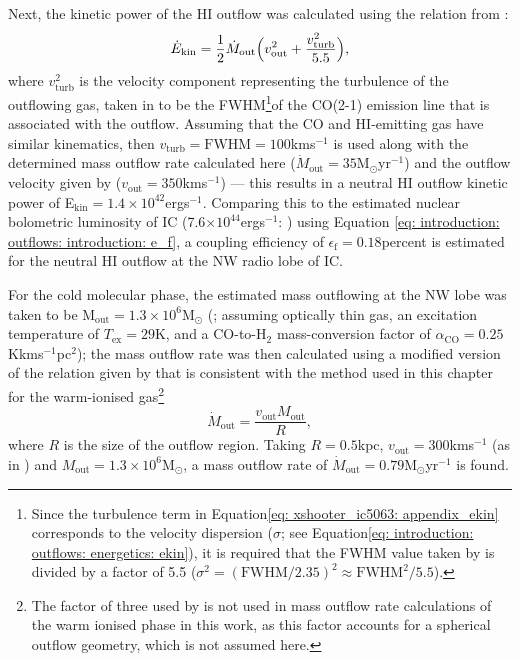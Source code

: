 Next, the kinetic power of the HI outflow was calculated using the relation from \citet{Morganti2015}:
\begin{equation}
    \dot{E}_\mathrm{kin} = \frac{1}{2}\dot{M}_\mathrm{out}\Bigl(v^2_\mathrm{out}+\frac{v^2_\mathrm{turb}}{5.5}\Bigr),
\label{eq: xshooter_ic5063: appendix_ekin}
\end{equation}
where $v^2_\mathrm{turb}$ is the velocity component representing the turbulence of the outflowing gas, taken in \citet{Morganti2015} to be the FWHM\footnote{Since the turbulence term in Equation\;\ref{eq: xshooter_ic5063: appendix_ekin} corresponds to the velocity dispersion ($\sigma$; see Equation\;\ref{eq: introduction: outflows: energetics: ekin}), it is required that the FWHM value taken by \citet{Morganti2015} is divided by a factor of 5.5 ($\sigma^2=(\mathrm{FWHM}/2.35)^2\approx\mathrm{FWHM}^2/5.5$).}of the CO(2-1) emission line that is associated with the outflow. Assuming that the CO and HI-emitting gas have similar kinematics, then $v_\mathrm{turb}=\mathrm{FWHM}=100$\;km\;s$^{-1}$ \citep{Morganti2015} is used along with the determined mass outflow rate calculated here ($\dot{M}_\mathrm{out}=35$\;M$_\odot$\;yr$^{-1}$) and the outflow velocity given by \citet{Morganti2005} ($v_\mathrm{out}=350$\;km\;s$^{-1}$) --- this results in a neutral HI outflow kinetic power of \mbox{E$_\mathrm{kin}=1.4\times10^{42}$\;erg\;s$^{-1}$}. Comparing this to the estimated nuclear bolometric luminosity of IC (7.6$\times10^{44}$\;erg\;s$^{-1}$: \citealt{Nicastro2003, Morganti2007}) using Equation \ref{eq: introduction: outflows: introduction: e_f}, a coupling efficiency of $\epsilon_\mathrm{f}=0.18$\;per\;cent is estimated for the neutral HI outflow at the NW radio lobe of IC.

For the cold molecular phase, the estimated mass outflowing at the NW lobe was taken to be \mbox{M$_\mathrm{out}=1.3\times10^{6}$\;M$_\odot$} (\citealt{Oosterloo2017}; assuming optically thin gas, an excitation temperature of $T_\mathrm{ex}=29$\;K, and a CO-to-H$_\mathrm{2}$ mass-conversion factor of $\alpha_\mathrm{CO} =
0.25$\;K\;km\;s$^{-1}$\;pc$^2$); the mass outflow rate was then calculated using a modified version of the relation given by \citet{Oosterloo2017} that is consistent with the method used in this chapter for the warm-ionised gas\footnote{The factor of three used by \citet{Oosterloo2017} is not used in mass outflow rate calculations of the warm ionised phase in this work, as this factor accounts for a spherical outflow geometry, which is not assumed here.}
\begin{equation}
    \dot{M}_\mathrm{out}=\frac{v_\mathrm{out}M_\mathrm{out}}{R},
\end{equation}
where $R$ is the size of the outflow region. Taking $R=0.5$\;kpc, $v_\mathrm{out}=300$\;km\;s$^{-1}$ (as in \citealt{Oosterloo2017}) and \mbox{$M_\mathrm{out}=1.3\times10^{6}$\;M$_\odot$}, a mass outflow rate of \mbox{$\dot{M}_\mathrm{out}=0.79$\;M$_\odot$\;yr$^{-1}$} is found.

